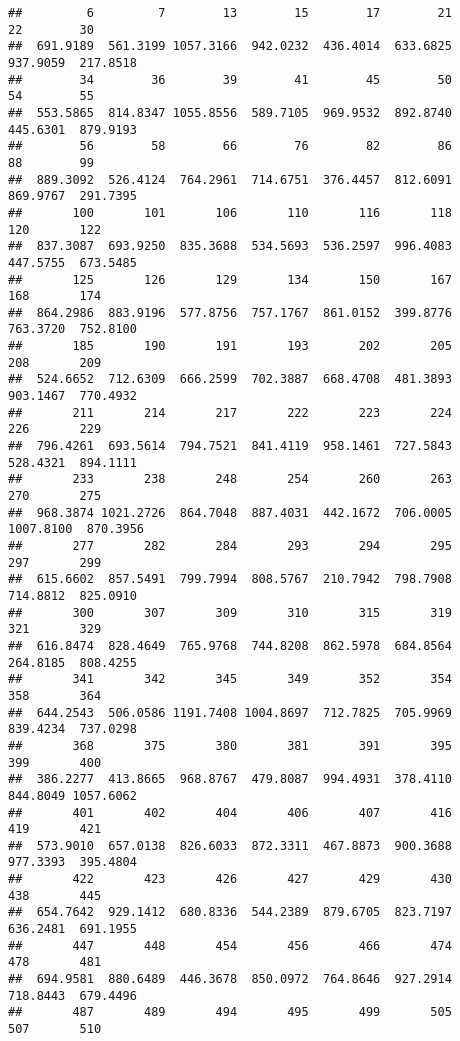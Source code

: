 \documentclass[
]{article}
\begin{document}
\begin{verbatim}
##         6         7        13        15        17        21        22        30 
##  691.9189  561.3199 1057.3166  942.0232  436.4014  633.6825  937.9059  217.8518 
##        34        36        39        41        45        50        54        55 
##  553.5865  814.8347 1055.8556  589.7105  969.9532  892.8740  445.6301  879.9193 
##        56        58        66        76        82        86        88        99 
##  889.3092  526.4124  764.2961  714.6751  376.4457  812.6091  869.9767  291.7395 
##       100       101       106       110       116       118       120       122 
##  837.3087  693.9250  835.3688  534.5693  536.2597  996.4083  447.5755  673.5485 
##       125       126       129       134       150       167       168       174 
##  864.2986  883.9196  577.8756  757.1767  861.0152  399.8776  763.3720  752.8100 
##       185       190       191       193       202       205       208       209 
##  524.6652  712.6309  666.2599  702.3887  668.4708  481.3893  903.1467  770.4932 
##       211       214       217       222       223       224       226       229 
##  796.4261  693.5614  794.7521  841.4119  958.1461  727.5843  528.4321  894.1111 
##       233       238       248       254       260       263       270       275 
##  968.3874 1021.2726  864.7048  887.4031  442.1672  706.0005 1007.8100  870.3956 
##       277       282       284       293       294       295       297       299 
##  615.6602  857.5491  799.7994  808.5767  210.7942  798.7908  714.8812  825.0910 
##       300       307       309       310       315       319       321       329 
##  616.8474  828.4649  765.9768  744.8208  862.5978  684.8564  264.8185  808.4255 
##       341       342       345       349       352       354       358       364 
##  644.2543  506.0586 1191.7408 1004.8697  712.7825  705.9969  839.4234  737.0298 
##       368       375       380       381       391       395       399       400 
##  386.2277  413.8665  968.8767  479.8087  994.4931  378.4110  844.8049 1057.6062 
##       401       402       404       406       407       416       419       421 
##  573.9010  657.0138  826.6033  872.3311  467.8873  900.3688  977.3393  395.4804 
##       422       423       426       427       429       430       438       445 
##  654.7642  929.1412  680.8336  544.2389  879.6705  823.7197  636.2481  691.1955 
##       447       448       454       456       466       474       478       481 
##  694.9581  880.6489  446.3678  850.0972  764.8646  927.2914  718.8443  679.4496 
##       487       489       494       495       499       505       507       510 

\end{verbatim}
\end{document}
